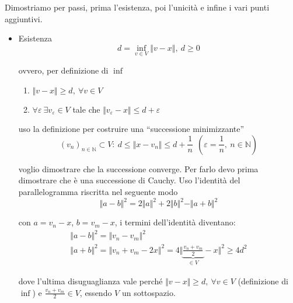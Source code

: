 \documentclass[10pt,a4paper,twoside,openright]{book}
\begin{document}
\begin{dimostrazione}
	Dimostriamo per passi, prima l'esistenza, poi l'unicità e infine i vari punti aggiuntivi.
	\begin{itemize}
		\item Esistenza
		\begin{equation*}
		      d=\inf_{v\in V}\Vert v-x\Vert,\ d\geqslant 0
		\end{equation*}
		
		ovvero, per definizione di $\inf$
		\begin{enumerate}
			\item $\displaystyle \Vert v-x\Vert \geqslant d,\ \forall v\in V$
			\item $\displaystyle \forall \varepsilon \ \exists v_{\varepsilon } \in V$ tale che $\displaystyle \Vert v_{\varepsilon } -x\Vert \leqslant d+\varepsilon $ \ $ $
		\end{enumerate}
		
		uso la definizione per costruire una ``successione minimizzante''
		\begin{equation}
			(v_{n})_{n\in \mathbb{N}} \subset V:\ d\leqslant \Vert x-v_{n}\Vert \leqslant d+\frac{1}{n} \ \ \left(\varepsilon =\frac{1}{n},\ n\in \mathbb{N}\right)
			\label{eq:teo-proiez-suc-min}
		\end{equation}
		
		voglio dimostrare che la successione converge. Per farlo devo prima dimostrare che è una successione di Cauchy. Uso l'identità del parallelogramma riscritta nel seguente modo
		\begin{equation*}
		\Vert a-b\Vert ^{2} =2\Vert a\Vert ^{2} +2\Vert b\Vert ^{2} -\Vert a+b\Vert ^{2}
		\end{equation*}
		
		con $\displaystyle a=v_{n} -x$, $\displaystyle b=v_{m} -x$, i termini dell'identità diventano:
		\begin{equation*}
		\begin{array}{ l }
			\Vert a-b\Vert ^{2} =\Vert v_{n} -v_{m}\Vert ^{2}                                                                                                 \\
			\Vert a+b\Vert ^{2} =\Vert v_{n} +v_{m} -2x\Vert ^{2} =4\bigg\Vert \underbrace{\frac{v_{n} +v_{m}}{2}}_{\in V} -x\bigg\Vert ^{2} \geqslant 4d^{2} 
		\end{array}
		\end{equation*}
		
		dove l'ultima disuguaglianza vale perché $\Vert v-x\Vert \geqslant d,\ \forall v\in V$ (definizione di $\inf$) e $\displaystyle \frac{v_{n} +v_{m}}{2} \in V$, essendo $V$ un sottospazio.
		

\end{itemize}
\end{dimostrazione}
\end{document}
